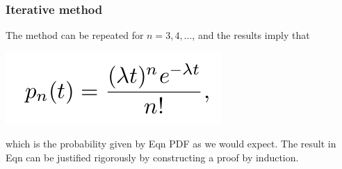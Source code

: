 \documentclass[spanish]{beamer}
\begin{document}
\begin{frame}
\frametitle{Iterative method}

The method can be repeated for $n = 3, 4,\ldots$, and the results imply that
 
\begin{center}
\includegraphics[scale=0.35]{im32}
\end{center}

which is the probability given by Eqn PDF as we would expect. The result in Eqn can be justified rigorously by constructing a proof by induction.

\end{frame}

\end{document}
